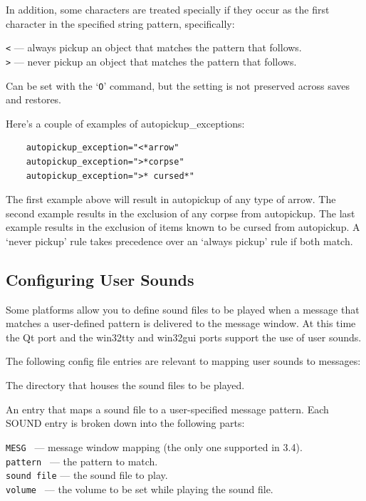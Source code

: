 In addition, some characters are treated specially if they occur as the first 
character in the specified string pattern, specifically:

{\tt <} --- always pickup an object that matches the pattern that follows.\\
{\tt >} --- never pickup an object that matches the pattern that follows.

Can be set with the `{\tt O}' command, but the setting is not preserved
across saves and restores.
\elist

Here's a couple of examples of autopickup\_exceptions:
\begin{verbatim}
    autopickup_exception="<*arrow"
    autopickup_exception=">*corpse"
    autopickup_exception=">* cursed*"
\end{verbatim}

The first example above will result in autopickup of any type of arrow.
The second example results in the exclusion of any corpse from autopickup.
The last example results in the exclusion of items known to be cursed from autopickup.
A `never pickup' rule takes precedence over an `always pickup' rule if both match.

\subsection*{Configuring User Sounds}

Some platforms allow you to define sound files to be played when a message 
that matches a user-defined pattern is delivered to the message window.
At this time the Qt port and the win32tty and win32gui ports support the
use of user sounds.

The following config file entries are relevant to mapping user sounds
to messages:

\blist{}
\item[\ib{SOUNDDIR}]
The directory that houses the sound files to be played.
\item[\ib{SOUND}]
An entry that maps a sound file to a user-specified message pattern.
Each SOUND entry is broken down into the following parts:

{\tt MESG      } --- message window mapping (the only one supported in 3.4).\\
{\tt pattern   } --- the pattern to match.\\
{\tt sound file} --- the sound file to play.\\
{\tt volume    } --- the volume to be set while playing the sound file.
\elist

